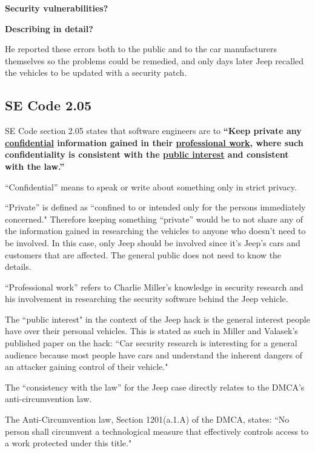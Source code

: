 \documentclass[12pt]{article}
\begin{document}
\begin{multicols}{2}
\textbf{Security vulnerabilities?}

\textbf{Describing in detail?}

He reported these errors both to the public and to the car manufacturers themselves so the problems could be remedied, and only days later Jeep recalled the vehicles to be updated with a security patch.\cite{recall}



\subsection{SE Code 2.05}

SE Code section 2.05 states that software engineers are to \textbf{``Keep private any \underline{confidential} information gained in their \underline{professional work}, where such confidentiality is consistent with the \underline{public interest} and consistent with the law.''}\cite{seCode}

``Confidential'' means to speak or write about something only in strict privacy.\cite{dictionary}

``Private'' is defined as ``confined to or intended only for the persons immediately concerned."\cite{dictionary} Therefore keeping something ``private'' would be to not share any of the information gained in researching the vehicles to anyone who doesn't need to be involved. In this case, only Jeep should be involved since it's Jeep's cars and customers that are affected. The general public does not need to know the details.

``Professional work'' refers to Charlie Miller's knowledge in security research and his involvement in researching the security software behind the Jeep vehicle. 

The ``public interest" in the context of the Jeep hack is the general interest people have over their personal vehicles. This is stated as such in Miller and Valasek's published paper on the hack: ``Car security research is interesting for a general audience because most people have cars and understand the inherent dangers of an attacker gaining control of their vehicle." \cite{officialPaper}

The ``consistency with the law'' for the Jeep case directly relates to the DMCA's anti-circumvention law. 

The Anti-Circumvention law, Section 1201(a.1.A) of the DMCA, states: ``No person shall circumvent a technological measure that effectively controls access to a work protected under this title."\cite{DMCA}



\end{multicols}
\end{document}
